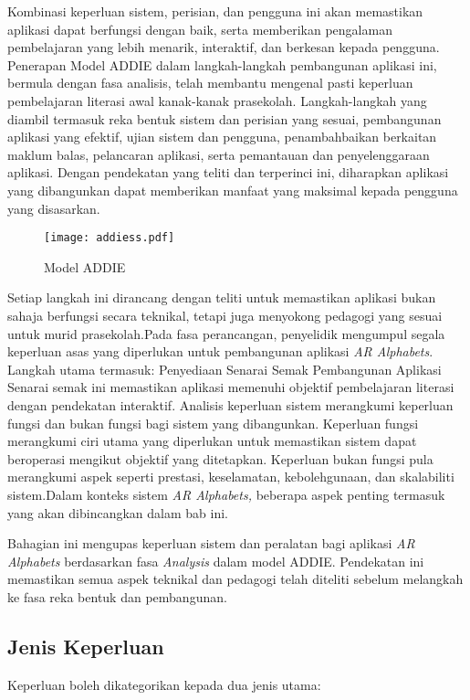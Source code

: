 \hspace{1cm} Kombinasi keperluan sistem, perisian, dan pengguna ini akan memastikan aplikasi dapat berfungsi dengan baik, serta memberikan pengalaman pembelajaran yang lebih menarik, interaktif, dan berkesan kepada pengguna. Penerapan Model ADDIE dalam langkah-langkah pembangunan aplikasi ini, bermula dengan fasa analisis, telah membantu mengenal pasti keperluan pembelajaran literasi awal kanak-kanak prasekolah. Langkah-langkah yang diambil termasuk reka bentuk sistem dan perisian yang sesuai, pembangunan aplikasi yang efektif, ujian sistem dan pengguna, penambahbaikan berkaitan maklum balas, pelancaran aplikasi, serta pemantauan dan penyelenggaraan aplikasi. Dengan pendekatan yang teliti dan terperinci ini, diharapkan aplikasi yang dibangunkan dapat memberikan manfaat yang maksimal kepada pengguna yang disasarkan.




\begin{figure}
    \centering
    \texttt{[image: addiess.pdf]}
    \caption{Model ADDIE}
    \label{fig:addie}
\end{figure}


\hspace{1cm} Setiap langkah ini dirancang dengan teliti untuk memastikan aplikasi bukan sahaja berfungsi secara teknikal, tetapi juga menyokong pedagogi yang sesuai untuk murid prasekolah.Pada fasa perancangan, penyelidik mengumpul segala keperluan asas yang diperlukan untuk pembangunan aplikasi \textit{AR Alphabets}. Langkah utama termasuk:
Penyediaan Senarai Semak Pembangunan Aplikasi Senarai semak ini memastikan aplikasi memenuhi objektif pembelajaran literasi dengan pendekatan interaktif.
Analisis keperluan sistem merangkumi keperluan fungsi dan bukan fungsi bagi sistem yang dibangunkan. Keperluan fungsi merangkumi ciri utama yang diperlukan untuk memastikan sistem dapat beroperasi mengikut objektif yang ditetapkan. Keperluan bukan fungsi pula merangkumi aspek seperti prestasi, keselamatan, kebolehgunaan, dan skalabiliti sistem.Dalam konteks sistem \textit{AR Alphabets,} beberapa aspek penting termasuk yang akan dibincangkan dalam bab ini.

Bahagian  ini mengupas keperluan sistem dan peralatan bagi aplikasi \textit{AR Alphabets }berdasarkan fasa \textit{Analysis} dalam model ADDIE. Pendekatan ini memastikan semua aspek teknikal dan pedagogi telah diteliti sebelum melangkah ke fasa reka bentuk dan pembangunan.


\subsection{Jenis Keperluan}
Keperluan boleh dikategorikan kepada dua jenis utama:

